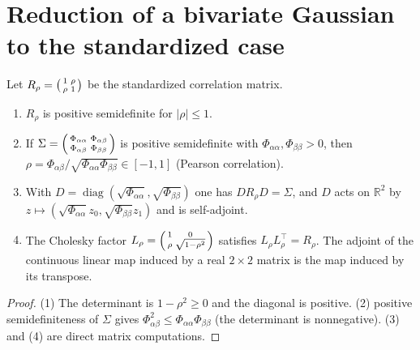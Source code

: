 \section{Reduction of a bivariate Gaussian to the standardized case}\label{sec:ntkr:reduction}

Let $R_\rho=\begin{psmallmatrix}1&\rho\\ \rho&1\end{psmallmatrix}$ be the standardized correlation matrix.

\begin{lemma}\label{lem:ntkr:corr}
  \leanok
\begin{enumerate}
  \item $R_\rho$ is positive semidefinite for $|\rho|\le1$.
  \item If $\Sigma=\begin{psmallmatrix}\Phi_{\alpha\alpha}&\Phi_{\alpha\beta}\\ \Phi_{\alpha\beta}&\Phi_{\beta\beta}\end{psmallmatrix}$
        is positive semidefinite with $\Phi_{\alpha\alpha},\Phi_{\beta\beta}>0$, then
        $\rho=\Phi_{\alpha\beta}/\sqrt{\Phi_{\alpha\alpha}\Phi_{\beta\beta}}\in[-1,1]$ (Pearson correlation).
  \item With $D=\operatorname{diag}(\sqrt{\Phi_{\alpha\alpha}},\sqrt{\Phi_{\beta\beta}})$ one has $DR_\rho D=\Sigma$,
        and $D$ acts on $\mathbb R^2$ by $z\mapsto(\sqrt{\Phi_{\alpha\alpha}}z_0,\sqrt{\Phi_{\beta\beta}}z_1)$ and is self-adjoint.
  \item The Cholesky factor $L_\rho=\begin{psmallmatrix}1&0\\ \rho&\sqrt{1-\rho^2}\end{psmallmatrix}$ satisfies $L_\rho L_\rho^\top=R_\rho$.
        The adjoint of the continuous linear map induced by a real $2\times2$ matrix is the map induced by its transpose.
\end{enumerate}
\end{lemma}

\begin{proof}
  \leanok
(1) The determinant is $1-\rho^2\ge0$ and the diagonal is positive. (2) positive semidefiniteness of
$\Sigma$ gives $\Phi_{\alpha\beta}^2\le\Phi_{\alpha\alpha}\Phi_{\beta\beta}$ (the determinant is
nonnegative). (3) and (4) are direct matrix computations.
\end{proof}

